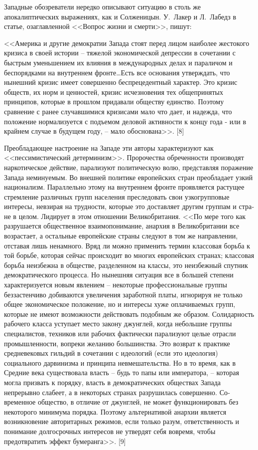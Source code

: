 \documentclass{book}
\begin{document}
{Западные обозреватели нередко описывают ситуацию в столь же апокалиптических выражениях, как и Солженицын. У.~Лакер и Л.~Лабедз в статье, озаглавленной <<Вопрос жизни и смерти>>, пишут:

<<Америка и другие демократии Запада стоят перед лицом наиболее жестокого кризиса в своей истории -- тяжелой эконо­мической депрессии в сочетании с быстрым уменьшением их влияния в международных делах и параличом и беспорядками на внутреннем фронте\ldots Есть все основания утверждать, что нынешний кризис имеет совершенно беспрецедентный харак­тер. Это кризис обществ, их норм и ценностей, кризис исчез­новения тех общепринятых принципов, которые в прошлом придавали обществу единство. Поэтому сравнение с ранее слу­чавшимися кризисами мало что дает, и надежда, что положе­ние нормализуется с подъемом деловой активности к концу года - или в крайнем случае в будущем году, -- мало обосно­вана>>. [8]

Преобладающее настроение на Западе эти авторы характе­ризуют как <<пессимистический детерминизм>>. Пророчества обреченности производят наркотическое действие, парализуют политическую волю, представляя поражение Запада немину­емым. Во внешней политике европейских стран преобладает узкий национализм. Параллельно этому на внутреннем фрон­те проявляется растущее стремление различных групп населе­ния преследовать свои узкогрупповые интересы, невзирая на трудности, которые это доставляет другим группам и стра­не в целом. Лидирует в этом отношении Великобритания. <<По мере того как разрушается общественное взаимопонимание, анархия в Великобритании все возрастает, а остальные евро­пейские страны следуют в том же направлении, отставая лишь ненамного. Вряд ли можно применить термин классовая борьба к  той борьбе, которая сейчас происходит во многих евро­пейских странах; классовая борьба неизбежна в обществе, раз­деленном на классы, это неизбежный спутник демократиче­ского процесса. Но нынешняя ситуация все в большей 
степени характеризуется новым явлением -- некоторые професси­ональные группы беззастенчиво добиваются увеличения зара­ботной платы, игнорируя не только общее экономическое положение, но и интересы хуже оплачиваемых групп, которые не имеют возможности действовать подобным же образом. Солидарность рабочего класса уступает место закону джунг­лей, когда небольшие группы специалистов, техников или ра­бочих фактически парализуют целые отрасли промышленно­сти, вопреки желанию большинства. Это возврат к практике средневековых гильдий в сочетании с идеологий (если это идеология) социального дарвинизма и принципа невмешатель­ства. Но в то время, как в Средние века существовала власть -- будь то папы или императора, -- которая могла призвать к поряд­ку, власть в демократических обществах Запада непрерывно слабеет, а в некоторых странах разрушилась совершенно. Со­временное общество, в отличие от джунглей, не может функ­ционировать без некоторого минимума порядка. Поэтому альтернативой анархии является возникновение 
авторитарных режимов, если только разум, ответственность и понимание долгосрочных интересов не утвердят себя вовремя, чтобы предотвратить эффект бумеранга>>. [9]

}
\end{document}
